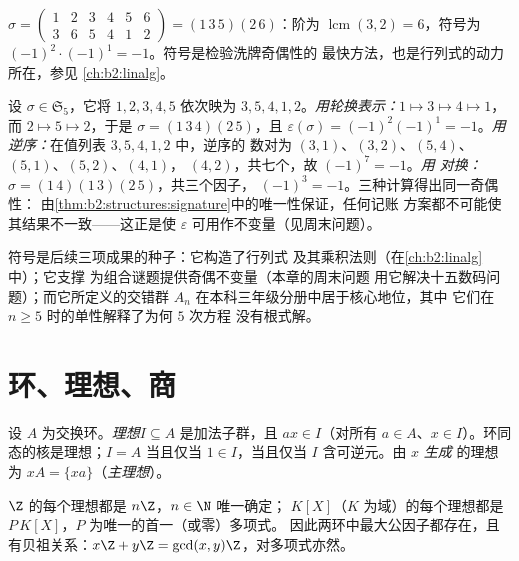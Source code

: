\begin{example}\label{ex:b2:structures:snexample}
$\sigma = \begin{pmatrix} 1&2&3&4&5&6\\ 3&6&5&4&1&2 \end{pmatrix}
= (1\,3\,5)(2\,6)$：阶为 $\operatorname{lcm}(3,2) = 6$，符号为
$(-1)^{2}\cdot(-1)^{1} = -1$。符号是检验洗牌奇偶性的
最快方法，也是行列式的动力所在，参见
\cref{ch:b2:linalg}。
\end{example}

\begin{example}[通向同一符号的三条路]\label{ex:b2:structures:threeroads}
设 $\sigma \in \mathfrak{S}_5$，它将 $1, 2, 3, 4, 5$ 依次映为 $3, 5, 4,
1, 2$。\emph{用轮换表示：}$1 \mapsto 3 \mapsto 4 \mapsto 1$，而 $2
\mapsto 5 \mapsto 2$，于是 $\sigma = (1\,3\,4)(2\,5)$，且
$\varepsilon(\sigma) = (-1)^{2}(-1)^{1} = -1$。\emph{用
逆序：}在值列表 $3, 5, 4, 1, 2$ 中，逆序的
数对为 $(3,1)$、$(3,2)$、$(5,4)$、$(5,1)$、$(5,2)$、$(4,1)$，
$(4,2)$，共七个，故 $(-1)^7 = -1$。\emph{用
对换：}$\sigma = (1\,4)(1\,3)(2\,5)$，共三个因子，
$(-1)^3 = -1$。三种计算得出同一奇偶性：
由\cref{thm:b2:structures:signature}中的唯一性保证，任何记账
方案都不可能使其结果不一致——这正是使
$\varepsilon$ 可用作不变量（见周末问题）。
\end{example}

\begin{remark}[符号的后续应用]
符号是后续三项成果的种子：它构造了行列式
及其乘积法则（在\cref{ch:b2:linalg}中）；它支撑
为组合谜题提供奇偶不变量（本章的周末问题
用它解决十五数码问题）；而它所定义的交错群
$A_n$ 在本科三年级分册中居于核心地位，其中
它们在 $n \geq 5$ 时的单性解释了为何 $5$ 次方程
没有根式解。
\end{remark}

\section{环、理想、商}

\begin{definition}[理想]\label{def:b2:structures:ideal}
设 $A$ 为交换环。\emph{理想}$I
\subseteq A$ 是加法子群，且 $a x \in I$（对所有
$a \in A$、$x \in I$）。环同态的核是理想；$I = A$
当且仅当 $1 \in I$，当且仅当 $I$ 含可逆元。由 $x$ \emph{生成}
的理想为 $xA = \{xa\}$（\emph{主理想}）。
\end{definition}

\begin{theorem}[{$\Z$ 与 $K[X]$ 的理想}]\label{thm:b2:structures:principal}
$\Z$ 的每个理想都是 $n\Z$，$n \in \N$ 唯一确定；
$K[X]$（$K$ 为域）的每个理想都是 $P\,K[X]$，$P$ 为唯一的首一（或零）多项式。
因此两环中最大公因子都存在，且有贝祖关系：$x\Z +
y\Z = \gcd(x,y)\Z$，对多项式亦然。
\end{theorem}

